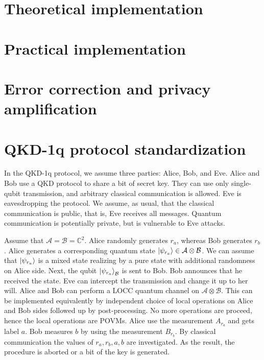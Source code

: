 \documentclass[12pt,a4paper,reqno, aps, superscriptaddress]{amsart}
\newcommand{\C}{\ensuremath{\mathbb{C}}}
\renewcommand{\AA}{\ensuremath{\mathcal{A}}}
\newcommand{\BB}{\ensuremath{\mathcal{B}}}
\begin{document}
\section{Theoretical implementation}\label{sec-implementation-theory}

\section{Practical implementation}\label{sec-implemntation-practice}

\section{Error correction and privacy amplification}\label{sec-ec-pa}
\newpage

\appendix


\section{QKD-1q protocol standardization}\label{sec-qkd-standard}

In the QKD-1q protocol, we assume three parties: Alice, Bob, and Eve. Alice and Bob use a QKD protocol to share a bit of secret key. They can use only single-qubit transmission, and arbitrary classical communication is allowed. Eve is eavesdropping the protocol. We assume, as usual, that the classical communication is public, that is, Eve receives all messages. Quantum communication is potentially private, but is vulnerable to Eve attacks. 


Assume that $\AA = \BB = \C^2$. 
Alice randomly generates $r_a$, whereas Bob generates $r_b$.
Alice generates a corresponding quantum state $\ket{\psi_{r_a}} \in \AA \otimes \BB$. We can assume that $\ket{\psi_{r_a}} $ is a mixed state realizing by a pure state with additional randomness on Alice side. Next, the qubit $\ket{\psi_{r_a}}_\BB$ is sent to Bob.
Bob announces that he received the state. Eve can intercept the transmission and change it up to her will. Alice and Bob can perform a LOCC quantum channel on $\AA \otimes \BB$. This can be implemented equivalently by independent choice of local operations on Alice and Bob sides followed up by post-processing. No more operations are proceed, hence the local operations are POVMs. Alice use the measurement $A_{r_a}$ and gets label $a$. Bob measures $b$ by using the measurement $B_{r_b}$. By classical communication the values of $r_a, r_b, a, b$ are investigated. As the result, the procedure is aborted or a bit of the key is generated.
\end{document}
